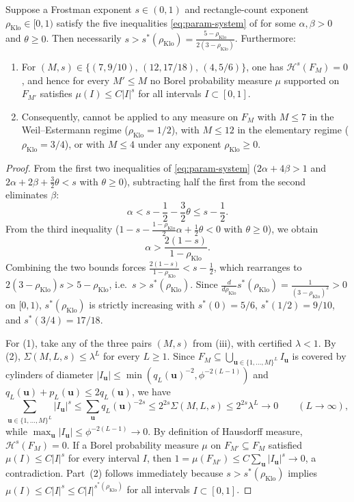 \documentclass[11pt]{article}
\newcommand{\Hmeas}{\mathcal{H}}
\newcommand{\rhoK}{\rho_{\mathrm{Klo}}}
\begin{document}
\begin{theorem}\label{thm:barriers}
Suppose a Frostman exponent $s\in(0,1)$ and rectangle-count exponent $\rhoK\in[0,1)$ satisfy the five inequalities \eqref{eq:param-system} of  for some $\alpha,\beta>0$ and $\theta\ge0$. Then necessarily $s>s^*(\rhoK)=\frac{5-\rhoK}{2(3-\rhoK)}$. Furthermore:
\begin{enumerate}[label=\textup{(\arabic*)},nosep]
\item For $(M,s)\in\{(7,9/10),\,(12,17/18),\,(4,5/6)\}$, one has $\Hmeas^s(F_M)=0$, and hence for every $M'\le M$ no Borel probability measure $\mu$ supported on $F_{M'}$ satisfies $\mu(I)\le C|I|^s$ for all intervals $I\subset[0,1]$.
\item Consequently,  cannot be applied to any measure on $F_M$ with $M\le7$ in the Weil--Estermann regime ($\rhoK=1/2$), with $M\le12$ in the elementary regime ($\rhoK=3/4$), or with $M\le4$ under any exponent $\rhoK\ge0$.
\end{enumerate}
\end{theorem}

\begin{proof}
From the first two inequalities of \eqref{eq:param-system} ($2\alpha+4\beta>1$ and $2\alpha+2\beta+\frac32\theta<s$ with $\theta\ge0$), subtracting half the first from the second eliminates $\beta$:
\[
\alpha<s-\frac12-\frac32\theta\le s-\frac12.
\]
From the third inequality ($1-s-\frac{1-\rhoK}{2}\alpha+\frac12\theta<0$ with $\theta\ge0$), we obtain
\[
\alpha>\frac{2(1-s)}{1-\rhoK}.
\]
Combining the two bounds forces $\frac{2(1-s)}{1-\rhoK}<s-\frac12$, which rearranges to $2(3-\rhoK)s>5-\rhoK$, i.e.\ $s>s^*(\rhoK)$. Since $\frac{d}{d\rhoK}s^*(\rhoK)=\frac1{(3-\rhoK)^2}>0$ on $[0,1)$, $s^*(\rhoK)$ is strictly increasing with $s^*(0)=5/6$, $s^*(1/2)=9/10$, and $s^*(3/4)=17/18$.

For (1), take any of the three pairs $(M,s)$ from (iii), with certified $\lambda<1$. By (2), $\Sigma(M,L,s)\le\lambda^L$ for every $L\ge1$. Since $F_M\subseteq\bigcup_{\mathbf{u}\in\{1,\dots,M\}^L}I_{\mathbf{u}}$ is covered by cylinders of diameter $|I_{\mathbf{u}}|\le\min(q_L(\mathbf{u})^{-2},\phi^{-2(L-1)})$ and $q_L(\mathbf{u})+p_L(\mathbf{u})\le 2q_L(\mathbf{u})$, we have
\[
\sum_{\mathbf{u}\in\{1,\dots,M\}^L}|I_{\mathbf{u}}|^s\le\sum_{\mathbf{u}}q_L(\mathbf{u})^{-2s}\le 2^{2s}\Sigma(M,L,s)\le 2^{2s}\lambda^L\longrightarrow0\qquad(L\to\infty),
\]
while $\max_{\mathbf{u}}|I_{\mathbf{u}}|\le\phi^{-2(L-1)}\to0$. By definition of Hausdorff measure, $\Hmeas^s(F_M)=0$. If a Borel probability measure $\mu$ on $F_{M'}\subseteq F_M$ satisfied $\mu(I)\le C|I|^s$ for every interval $I$, then $1=\mu(F_{M'})\le C\sum_{\mathbf{u}}|I_{\mathbf{u}}|^s\to0$, a contradiction. Part~(2) follows immediately because $s>s^*(\rhoK)$ implies $\mu(I)\le C|I|^s\le C|I|^{s^*(\rhoK)}$ for all intervals $I\subset[0,1]$.
\end{proof}
\end{document}
